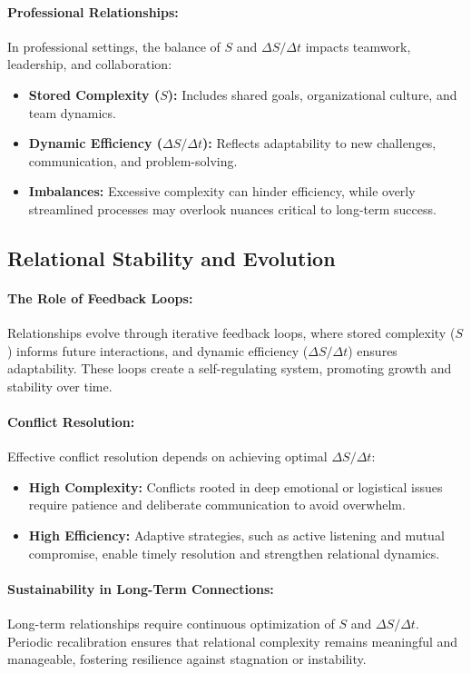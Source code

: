 \documentclass[12pt]{article}
\begin{document}
\paragraph{Professional Relationships:}
In professional settings, the balance of \( S \) and \( \Delta S / \Delta t \) impacts teamwork, leadership, and collaboration:
\begin{itemize}
    \item \textbf{Stored Complexity (\( S \)):} Includes shared goals, organizational culture, and team dynamics.
    \item \textbf{Dynamic Efficiency (\( \Delta S / \Delta t \)):} Reflects adaptability to new challenges, communication, and problem-solving.
    \item \textbf{Imbalances:} Excessive complexity can hinder efficiency, while overly streamlined processes may overlook nuances critical to long-term success.
\end{itemize}

\subsection{Relational Stability and Evolution}
\paragraph{The Role of Feedback Loops:}
Relationships evolve through iterative feedback loops, where stored complexity (\( S \)) informs future interactions, and dynamic efficiency (\( \Delta S / \Delta t \)) ensures adaptability. These loops create a self-regulating system, promoting growth and stability over time.

\paragraph{Conflict Resolution:}
Effective conflict resolution depends on achieving optimal \( \Delta S / \Delta t \):
\begin{itemize}
    \item \textbf{High Complexity:} Conflicts rooted in deep emotional or logistical issues require patience and deliberate communication to avoid overwhelm.
    \item \textbf{High Efficiency:} Adaptive strategies, such as active listening and mutual compromise, enable timely resolution and strengthen relational dynamics.
\end{itemize}

\paragraph{Sustainability in Long-Term Connections:}
Long-term relationships require continuous optimization of \( S \) and \( \Delta S / \Delta t \). Periodic recalibration ensures that relational complexity remains meaningful and manageable, fostering resilience against stagnation or instability.
\end{document}
